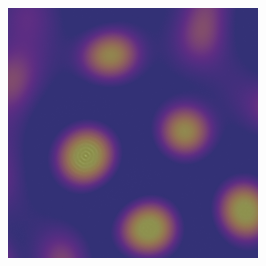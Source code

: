 \documentclass[showkeys, prb, reprint]{revtex4-1}
\begin{document}
\begin{figure}
\begin{subfigure}[b]{0.3\columnwidth}
        \label{fig:early_spinodal}
        \caption{}
    \end{subfigure}
    ~
    \begin{subfigure}[b]{0.3\columnwidth}
        \includegraphics[width=\textwidth]{devel_spinodal.png}
        \label{fig:devel_spinodal}
        \caption{}
    \end{subfigure}


\end{figure}
\end{document}

